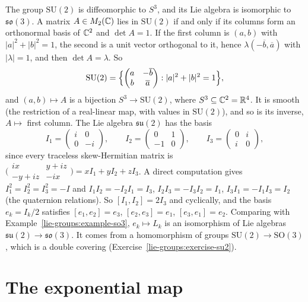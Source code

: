\begin{example}\label{lie-groups:example-su2}
The group $\mathrm{SU}(2)$ is diffeomorphic to $S^3$, and its Lie algebra is isomorphic to $\mathfrak{so}(3)$. A matrix $A \in M_2(\mathbb{C})$ lies in
$\mathrm{SU}(2)$ if and only if its columns form an orthonormal basis of $\mathbb{C}^2$ and $\det A = 1$. If the first column is $(a, b)$ with $|a|^2 + |b|^2 = 1$,
the second is a unit vector orthogonal to it, hence $\lambda(-\overline{b}, \overline{a})$ with $|\lambda| = 1$, and then $\det A = \lambda$. So
\[
\mathrm{SU}(2) = \Bigl\{\begin{pmatrix} a & -\overline{b}\\ b & \overline{a}\end{pmatrix} : |a|^2 + |b|^2 = 1\Bigr\},
\]
and $(a, b) \mapsto A$ is a bijection $S^3 \to \mathrm{SU}(2)$, where $S^3 \subseteq \mathbb{C}^2 = \mathbb{R}^4$. It is smooth (the restriction of a real-linear map, with
values in $\mathrm{SU}(2)$), and so is its inverse, $A \mapsto$ first column. The Lie algebra $\mathfrak{su}(2)$ has the basis
\[
I_1 = \begin{pmatrix} i & 0\\ 0 & -i\end{pmatrix}, \qquad I_2 = \begin{pmatrix} 0 & 1\\ -1 & 0\end{pmatrix}, \qquad I_3 = \begin{pmatrix} 0 & i\\ i & 0\end{pmatrix},
\]
since every traceless skew-Hermitian matrix is $\bigl(\begin{smallmatrix} ix & y + iz\\ -y + iz & -ix\end{smallmatrix}\bigr) = xI_1 + yI_2 + zI_3$. A direct
computation gives $I_1^2 = I_2^2 = I_3^2 = -I$ and $I_1I_2 = -I_2I_1 = I_3$, $I_2I_3 = -I_3I_2 = I_1$, $I_3I_1 = -I_1I_3 = I_2$ (the quaternion relations). So
$[I_1, I_2] = 2I_3$ and cyclically, and the basis $e_k = I_k/2$ satisfies $[e_1, e_2] = e_3$, $[e_2, e_3] = e_1$, $[e_3, e_1] = e_2$. Comparing with
Example~\ref{lie-groups:example-so3}, $e_k \mapsto L_k$ is an isomorphism of Lie algebras $\mathfrak{su}(2) \to \mathfrak{so}(3)$. It comes from a
homomorphism of groups $\mathrm{SU}(2) \to \mathrm{SO}(3)$, which is a double covering (Exercise~\ref{lie-groups:exercise-su2}).
\end{example}

\section{The exponential map}\label{lie-groups:section-exponential}

